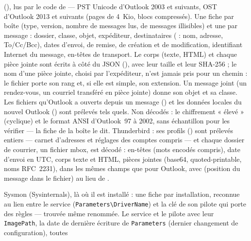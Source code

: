 \documentclass[11pt,a4paper,oneside]{report}
\begin{document}
\begin{description}[style=nextline,leftmargin=1.2em]
        (),
        lus par le code de \wac{} — PST Unicode d'Outlook 2003 et suivants, OST
        d'Outlook 2013 et suivants (pages de 4~Kio, blocs compressés). Une fiche
        par boîte (type, version, nombre de messages lus, de messages
        illisibles) et une par message : dossier, classe, objet, expéditeur,
        destinataires ( : nom, adresse, To/Cc/Bcc), dates
        d'envoi, de remise, de création et de modification, identifiant
        Internet du message, en-têtes de transport. Le corps (texte, HTML) et
        chaque pièce jointe sont écrits à côté du JSON
        (),
        avec leur taille et leur SHA-256 ; le nom d'une pièce jointe, choisi
        par l'expéditeur, n'est jamais pris pour un chemin : le fichier porte
        son rang et, si elle est simple, son extension. Un message joint (un
        rendez-vous, un courriel transféré en pièce jointe) donne son objet et
        sa classe. Les fichiers qu'Outlook a ouverts depuis un message
        () et les données
        locales du nouvel Outlook ()
        sont prélevés tels quels. Non décodés : le chiffrement « élevé »
        (cyclique) et le format ANSI d'Outlook~97 à 2002, sans échantillon pour
        les vérifier — la fiche de la boîte le dit. Thunderbird : ses profils
        ()
        sont prélevés entiers — carnet d'adresses et réglages des comptes
        compris — et chaque dossier de courrier, un fichier mbox, est décodé :
        en-têtes (mots encodés compris), date d'envoi en UTC, corps texte et
        HTML, pièces jointes (base64, quoted-printable, noms RFC~2231), dans
        les mêmes champs que pour Outlook, avec  (position du
        message dans le fichier) au lieu de .
  \item[\fichier{sysmon.json}] Sysmon (Sysinternals), là où il est
        installé : une fiche par installation, reconnue au lien entre le
        service (\texttt{Parameters\textbackslash DriverName}) et la clé de son
        pilote qui porte des règles — trouvée même renommée. Le service et
        le pilote avec leur \texttt{ImagePath}, la date de dernière écriture
        de \texttt{Parameters} (dernier changement de configuration), toutes

\end{description}
\end{document}
